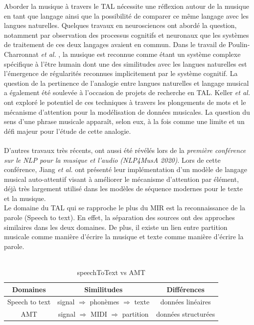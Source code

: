 Aborder la musique à travers le TAL nécessite une réflexion autour de la
musique en tant que langage ainsi que la possibilité de comparer ce même
langage avec les langues naturelles. Quelques travaux en neurosciences ont
abordé la question, notamment par observation des processus cognitifs et
neuronaux que les systèmes de traitement de ces deux langages avaient en
commun. Dans le travail de Poulin-Charronnat \textit{et al.}
\cite{poulincharronnat:hal-01985213}, la musique est reconnue comme étant un
système complexe spécifique à l’être humain dont une des similitudes avec les
langues naturelles est l’émergence de régularités reconnues implicitement par
le système cognitif. La question de la pertinence de l’analogie entre langues
naturelles et langage musical a également été soulevée à l’occasion de projets
de recherche en TAL. Keller \textit{et al.} \cite{keller:hal-03279850} ont
exploré le potentiel de ces techniques à travers les plongements de mots et le
mécanisme d’attention pour la modélisation de données musicales. La question du
sens d’une phrase musicale apparaît, selon eux, à la fois comme une limite et
un défi majeur pour l’étude de cette analogie.\\\\
D’autres travaux très récents, ont aussi été révélés lors de la
\textit{première conférence sur le NLP pour la musique et l'audio
(NLP4MusA 2020)}. Lors de cette conférence, Jiang \textit{et al.}
\cite{Jiang2020DiscoveringMR} ont présenté leur implémentation d’un modèle de
langage musical auto-attentif visant à améliorer le mécanisme d'attention par
élément, déjà très largement utilisé dans les modèles de séquence modernes pour
le texte et la musique.\\
Le domaine du TAL qui se rapproche le plus du MIR est la reconnaissance de la
parole (Speech to text). En effet, la séparation des sources ont des approches similaires dans
les deux domaines. De plus, il existe un lien entre partition musicale comme
manière d’écrire la musique et texte comme manière d’écrire la parole.\\\\
\begin{table}[h]
	\centering
	\begin{tabular}{|c|c|c|} \hline
		Domaines & Similitudes & Différences \\ \hline
		Speech to text & signal $\Rightarrow$ phonèmes $\Rightarrow$ texte & données linéaires\\
		AMT & signal $\Rightarrow$ MIDI $\Rightarrow$ partition & données structurées\\ \hline
	\end{tabular}
	\caption{speechToText vs AMT}
	\label{spToTxt_vs_AMT}
\end{table}
